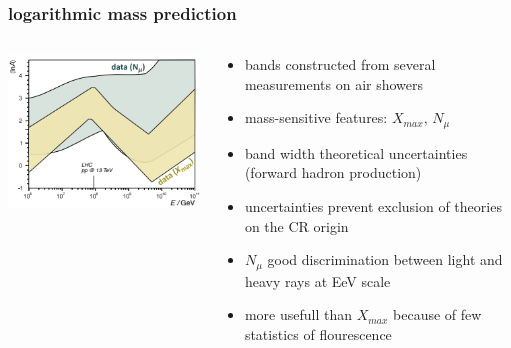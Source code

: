 \documentclass[aspectratio=1610, 9pt]{beamer}
\begin{document}
\begin{frame}\frametitle{logarithmic mass prediction}
  \begin{columns}
    \begin{column}[c]{0.48\textwidth}
      \includegraphics{lnA_right.png}
    \end{column}
    \begin{column}[c]{0.48\textwidth}
      \begin{itemize}
        \item bands constructed from several measurements on air showers
        \item mass-sensitive features: $X_{max}$, $N_{\mu}$
        \item band width \to theoretical uncertainties (forward hadron production)
        \item uncertainties prevent exclusion of theories on the CR origin
        \item $N_{\mu}$ good discrimination between light and heavy rays at EeV scale
        \item more usefull than $X_{max}$ because of few statistics of flourescence
      \end{itemize}
    \end{column}
  \end{columns}
\end{frame}
\end{document}

